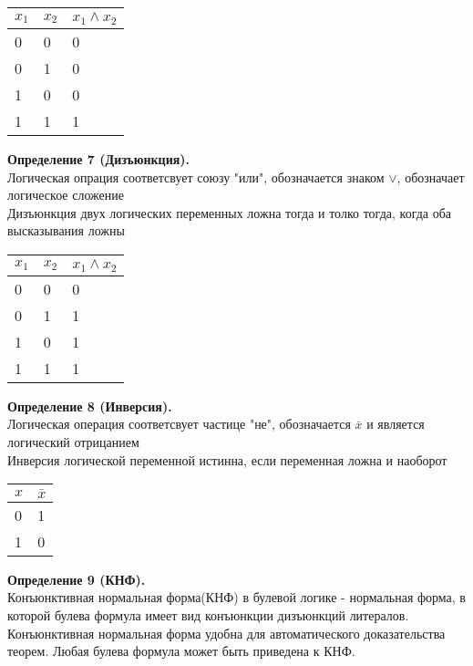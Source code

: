 \documentclass[12pt]{article}
\begin{document}
\begin{center}
\begin{tabular}[t]{|p{1em}|p{1em}|p{3em}|}
\hline
 $x_{1}$ & $x_{2}$ & $x_{1}\wedge x_{2}$ \\
\hline
 0 & 0 & 0 \\
\hline
 0 & 1 & 0 \\
\hline
 1 & 0 & 0 \\
\hline
 1 & 1 & 1 \\
\hline
\end{tabular}

\end{center}

\textbf{Определение 7 (Дизъюнкция).}\\
Логическая опрация соответсвует союзу "или", обозначается знаком $\vee$, обозначает логическое сложение
\\
Дизъюнкция двух логических переменных ложна тогда и толко тогда, когда оба высказывания ложны

\begin{center}
\begin{tabular}[t]{|p{1em}|p{1em}|p{3em}|}
\hline
 $x_{1}$ & $x_{2}$ & $x_{1}\wedge x_{2}$ \\
\hline
 0 & 0 & 0 \\
\hline
 0 & 1 & 1 \\
\hline
 1 & 0 & 1 \\
\hline
 1 & 1 & 1 \\
\hline
\end{tabular}

\end{center}

\textbf{Определение 8 (\textbf{Инверсия}).}\\
Логическая операция соответсвует частице "не", обозначается $\bar{x}$ и является логический отрицанием
\\ 
Инверсия логической переменной истинна, если переменная ложна и наоборот

\begin{center}
\begin{tabular}[t]{|p{1em}|p{1em}|}
\hline
 $x$ & $\bar{x}$ \\
\hline
 0 & 1 \\
\hline
 1 & 0 \\
\hline
\end{tabular}

\end{center}

\newpage
\textbf{Определение 9 (КНФ).}\\
Конъюнктивная нормальная форма(КНФ) в булевой логике - нормальная форма, в которой булева формула имеет вид конъюнкции дизъюнкций литералов. Конъюнктивная нормальная форма удобна для автоматического доказательства теорем. Любая булева формула может быть приведена к КНФ.
\end{document}
